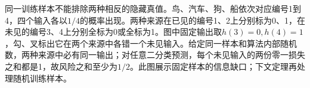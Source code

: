 同一训练样本不能排除两种相反的隐藏真值。鸟、汽车、狗、船依次对应编号1到4，四个输入各以$1/4$的概率出现。两种来源在已见的编号1、2上分别标为0、1，在未见的编号3、4上分别全标为0或全标为1。图中固定输出取$h(3)=0,h(4)=1$，勾、叉标出它在两个来源中各错一个未见输入。给定同一样本和算法内部随机数，两种来源中必有同一输出；对任意二分类预测，每个未见输入的两份零一损失之和都是1，故风险之和至少为$1/2$。此图展示固定样本的信息缺口；下文定理再处理随机训练样本。
